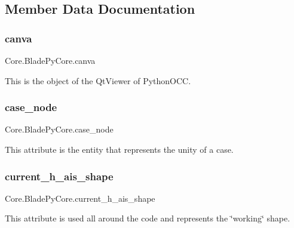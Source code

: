 \subsection{Member Data Documentation}
\hypertarget{a00078_ab277fbfb8af6b2ef9aff8d06c9f5cc82}{}\label{a00078_ab277fbfb8af6b2ef9aff8d06c9f5cc82} 
\subsubsection{\texorpdfstring{canva}{canva}}
{\footnotesize\ttfamily Core.\+Blade\+Py\+Core.\+canva}



This is the object of the Qt\+Viewer of Python\+O\+CC. 

\hypertarget{a00078_a76f4a1191b8d68c0ed9d9f3e1e6756d8}{}\label{a00078_a76f4a1191b8d68c0ed9d9f3e1e6756d8} 
\subsubsection{\texorpdfstring{case\+\_\+node}{case\_node}}
{\footnotesize\ttfamily Core.\+Blade\+Py\+Core.\+case\+\_\+node}



This attribute is the entity that represents the unity of a case. 

\hypertarget{a00078_a84a62c3017515ec840e35dbbe8ccbf21}{}\label{a00078_a84a62c3017515ec840e35dbbe8ccbf21} 
\subsubsection{\texorpdfstring{current\+\_\+h\+\_\+ais\+\_\+shape}{current\_h\_ais\_shape}}
{\footnotesize\ttfamily Core.\+Blade\+Py\+Core.\+current\+\_\+h\+\_\+ais\+\_\+shape}



This attribute is used all around the code and represents the \char`\"{}working\char`\"{} shape. 

